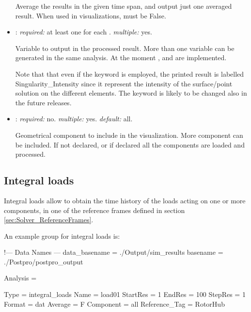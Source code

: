 \begin{itemize}
Average the results in the given time span, and output just one averaged result. When used in visualizations,  must be False.

\item {}: \textit{required:} at least one for each . \textit{multiple:} yes.

Variable to output in the processed result. More than one variable can be generated in the same analysis. At the moment ,  and  are implemented.

Note that that even if the keyword  is employed, the printed result is labelled Singularity\_Intensity since it represent the intensity of the surface/point solution on the different elements. The keyword is likely to be changed also in the future releases.

\item {}: \textit{required:} no. \textit{multiple:} yes. \textit{default:} all.

Geometrical component to include in the visualization. More component can be included. If not declared, or if declared  all the components are loaded and processed. 
\end{itemize}

\subsection{Integral loads}

Integral loads allow to obtain the time history of the loads acting on one or more components, in one of the reference frames defined in section \ref{sec:Solver_ReferenceFrames}.

An example  group for integral loads is:

\begin{inputfile}[frame=single, caption={dust\_post.in for integral loads}, label={file:dust_post.in_load}]
!--- Data Names ---
data_basename = ./Output/sim_results
basename =     ./Postpro/postpro_output

Analysis = {

Type = integral_loads
Name = load01
StartRes = 1
EndRes   = 100 
StepRes  = 1
Format = dat
Average = F
Component = all
Reference_Tag = RotorHub

}
\end{inputfile}

